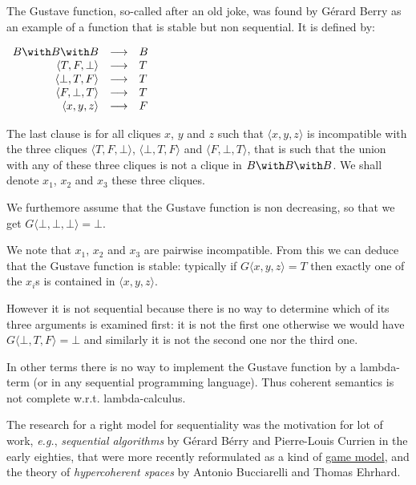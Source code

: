 The Gustave function, so-called after an old joke, was found by Gérard
Berry as an example of a function that is stable but non sequential. It
is defined by:

\(\begin{array}{rcl}
  B\with B\with B           & \longrightarrow&  B\\
  \langle T, F, \bot\rangle & \longrightarrow&  T\\
  \langle \bot, T, F\rangle & \longrightarrow&  T\\
  \langle F, \bot, T\rangle & \longrightarrow&  T\\
  \langle x, y, z\rangle    & \longrightarrow&  F
\end{array}\)

The last clause is for all cliques \(x\), \(y\) and \(z\) such that
\(\langle x, y ,z\rangle\) is incompatible with the three cliques
\(\langle T, F, \bot\rangle\), \(\langle \bot, T, F\rangle\) and
\(\langle F, \bot, T\rangle\), that is such that the union with any of
these three cliques is not a clique in \(B\with B\with B\). We shall
denote \(x_1\), \(x_2\) and \(x_3\) these three cliques.

We furthemore assume that the Gustave function is non decreasing, so
that we get \(G\langle\bot,\bot,\bot\rangle = \bot\).

We note that \(x_1\), \(x_2\) and \(x_3\) are pairwise incompatible.
From this we can deduce that the Gustave function is stable: typically
if \(G\langle x,y,z\rangle = T\) then exactly one of the \(x_i\)s is
contained in \(\langle x, y, z\rangle\).

However it is not sequential because there is no way to determine which
of its three arguments is examined first: it is not the first one
otherwise we would have \(G\langle\bot, T, F\rangle = \bot\) and
similarly it is not the second one nor the third one.

In other terms there is no way to implement the Gustave function by a
lambda-term (or in any sequential programming language). Thus coherent
semantics is not complete w.r.t. lambda-calculus.

The research for a right model for sequentiality was the motivation for
lot of work, \emph{e.g.}, \emph{sequential algorithms} by Gérard Bérry
and Pierre-Louis Currien in the early eighties, that were more recently
reformulated as a kind of \hyperref[game-semantics]{game model}, and the
theory of \emph{hypercoherent spaces} by Antonio Bucciarelli and Thomas
Ehrhard.

